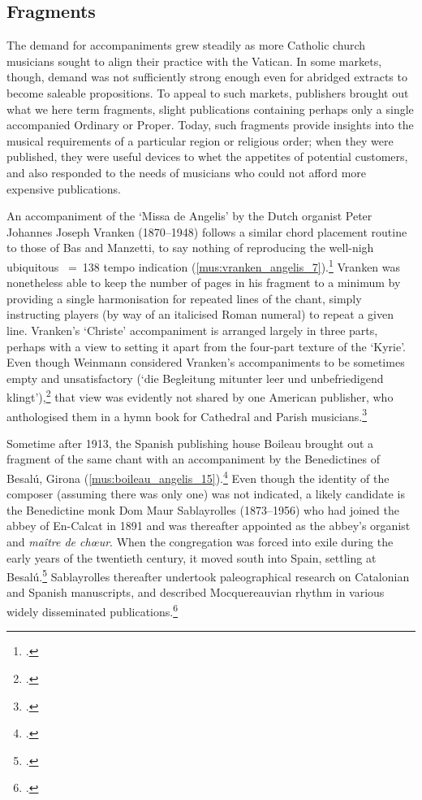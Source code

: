 \subsection{Fragments}
The demand for accompaniments grew steadily as more Catholic church musicians sought to align their practice with the Vatican.
In some markets, though, demand was not sufficiently strong enough even for abridged extracts to become saleable propositions.
To appeal to such markets, publishers brought out what we here term fragments, slight publications containing perhaps only a single accompanied Ordinary or Proper.
Today, such fragments provide insights into the musical requirements of a particular region or religious order; when they were published, they were useful devices to whet the appetites of potential customers, and also responded to the needs of musicians who could not afford more expensive publications.

An accompaniment of the `Missa de Angelis' by the Dutch organist Peter Johannes Joseph Vranken (1870--1948) follows a similar chord placement routine to those of Bas and Manzetti, to say nothing of reproducing the well-nigh ubiquitous \quaver~=~138 tempo indication (\cref{mus:vranken_angelis_7}).\footcite[7]{VrankenMissaDuplicibusAngelis1910}
Vranken was nonetheless able to keep the number of pages in his fragment to a minimum by providing a single harmonisation for repeated lines of the chant, simply instructing players (by way of an italicised Roman numeral) to repeat a given line.
Vranken's `Christe' accompaniment is arranged largely in three parts, perhaps with a view to setting it apart from the four-part texture of the `Kyrie'.
Even though Weinmann considered Vranken's accompaniments to be sometimes empty and unsatisfactory (`die Begleitung mitunter leer und unbefriedigend klingt'),\footcite[52]{WeinmannOrgelbegleitungGradualeRomanum1911} that view was evidently not shared by one American publisher, who anthologised them in a hymn book for Cathedral and Parish musicians.\footcites[7]{BurtonChoirManualCathedral1914}[Reproduced in][65]{JoksContemporaryUnderstandingGregorian2009}

Sometime after 1913, the Spanish publishing house Boileau brought out a fragment of the same chant with an accompaniment by the Benedictines of Besalú, Girona (\cref{mus:boileau_angelis_15}).\footcite[1]{BenedictonosdeBesaluMisaAngelisconforme}
Even though the identity of the composer (assuming there was only one) was not indicated, a likely candidate is the Benedictine monk Dom Maur Sablayrolles (1873--1956) who had joined the abbey of En-Calcat in 1891 and was thereafter appointed as the abbey's organist and \emph{maître de chœur}.
When the congregation was forced into exile during the early years of the twentieth century, it moved south into Spain, settling at Besalú.\footcite[see paragraph 19]{Dauzetcongresmusiquesacree2009}
Sablayrolles thereafter undertook paleographical research on Catalonian and Spanish manuscripts, and described Mocquereauvian rhythm in various widely disseminated publications.\footcite[51]{PujolElsmonjosbenedictins2019}

